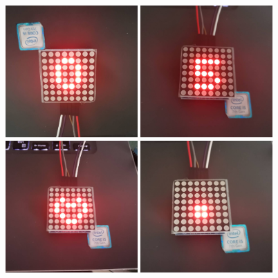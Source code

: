 \documentclass[UTF8, oneside]{ctexbook}
\begin{document}
\begin{figure}[h]
    \centering
    \includegraphics[width=0.45\textwidth]{./result/sensor/2/result2.jpg}
    \includegraphics[width=0.45\textwidth]{./result/sensor/2/result3.jpg}\\
    \includegraphics[width=0.45\textwidth]{./result/sensor/2/result4.jpg}
    \includegraphics[width=0.45\textwidth]{./result/sensor/2/result5.jpg}
\end{figure}
\end{document}
